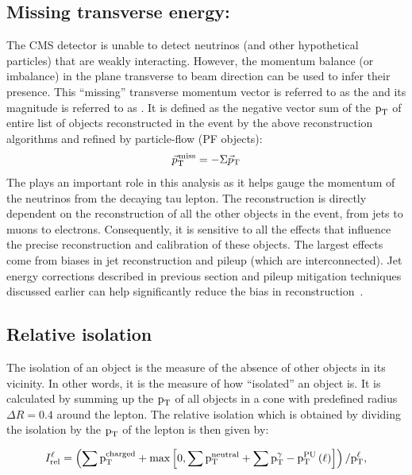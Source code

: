 \subsection{Missing transverse energy: \ptvecmiss} 
\label{mt_met_recon}
The CMS detector is unable to detect neutrinos (and other hypothetical particles) that are weakly interacting. However, the momentum balance (or imbalance) in the plane transverse to beam direction can be used to infer their presence. This ``missing'' transverse momentum vector is referred to as the \ptvecmiss and its magnitude is referred to as \ptmiss. It is defined as the negative vector sum of the $\text{p}_\text{T}$ of entire list of objects reconstructed in the event by the above reconstruction algorithms and refined by particle-flow (PF objects):
\begin{equation}
  {\vec p}_{\mathrm{T}}^{\kern1pt\text{miss}}=-\Sigma{\vec p}_{\mathrm{T}}
\end{equation}
The \ptvecmiss plays an important role in this analysis as it helps gauge the momentum of the neutrinos from the decaying tau lepton. The \ptvecmiss reconstruction is directly dependent on the reconstruction of all the other objects in the event, from jets to muons to electrons. Consequently, it is sensitive to all the effects that influence the precise reconstruction and calibration of these objects. The largest effects come from biases in jet reconstruction and pileup (which are interconnected). Jet energy corrections described in previous section and pileup mitigation techniques discussed earlier can help significantly reduce the bias in \ptvecmiss reconstruction~\cite{Sirunyan:2019kia}. 


\subsection{Relative isolation}
\label{isolation}
The isolation of an object is the measure of the absence of other objects in its vicinity. In other words, it is the measure of how ``isolated'' an object is. It is calculated by summing up the $\text{p}_\text{T}$ of all objects in a cone with predefined radius $\Delta R=0.4$ around the lepton. The relative isolation which is obtained by dividing the isolation by the $\text{p}_\text{T}$ of the lepton is then given by:

\begin{equation}
I_\text{rel}^{\ell} = \left( \sum  \text{p}_\text{T}^\text{charged} + \text{max}\left[ 0, \sum \text{p}_\text{T}^\text{neutral}
                                 +  \sum \text{p}_\text{T}^{\gamma} - \text{p}_\text{T}^\text{PU}\left(\ell\right)  \right] \right) /  \text{p}_\text{T}^{\ell},
\end{equation}

